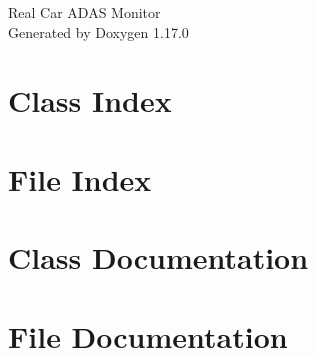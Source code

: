 \documentclass[twoside]{book}
\newcommand{\+}{\discretionary{\mbox{\scriptsize$\hookleftarrow$}}{}{}}
\newcommand{\clearemptydoublepage}{%
    \newpage{\pagestyle{empty}\cleardoublepage}%
  }
\begin{document}
  \raggedbottom
    \hypersetup{pageanchor=false,
                bookmarksnumbered=true,
                pdfencoding=unicode
               }
  \begin{titlepage}
  \vspace*{7cm}
  \begin{center}%
  {\Large Real Car ADAS Monitor}\\
  \vspace*{1cm}
  {\large Generated by Doxygen 1.17.0}\\
  \end{center}
  \end{titlepage}
  \clearemptydoublepage
  \tableofcontents
  \clearemptydoublepage
  \hypersetup{pageanchor=true}
\chapter{Class Index}

\chapter{File Index}

\chapter{Class Documentation}










\chapter{File Documentation}













  \backmatter
  \newpage
  \clearemptydoublepage
  \printindex
\end{document}
